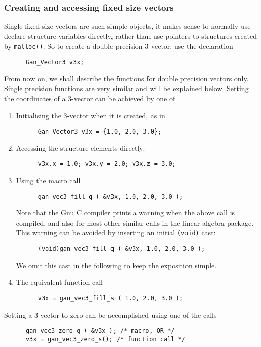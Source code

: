 \subsubsection{Creating and accessing fixed size vectors}
Single fixed size vectors are such simple objects, it makes sense to
normally use declare structure variables directly, rather than use pointers
to structures created by {\tt malloc()}. So to create a double precision
3-vector, use the declaration
\begin{verbatim}
      Gan_Vector3 v3x;
\end{verbatim}
From now on, we shall describe the functions for double precision vectors
only. Single precision functions are very similar and will be explained below.
Setting the coordinates of a 3-vector can be achieved by one of
\begin{enumerate}
  \item Initialising the 3-vector when it is created, as in
\begin{verbatim}
      Gan_Vector3 v3x = {1.0, 2.0, 3.0};
\end{verbatim}

  \item Accessing the structure elements directly:
\begin{verbatim}
      v3x.x = 1.0; v3x.y = 2.0; v3x.z = 3.0;
\end{verbatim}
  \item Using the macro call
\begin{verbatim}
      gan_vec3_fill_q ( &v3x, 1.0, 2.0, 3.0 );
\end{verbatim}
Note that the Gnu C compiler prints a warning when the above call is compiled,
and also for most other similar calls in the linear algebra package.
This warning can be avoided by inserting an initial {\tt (void)} cast:
\begin{verbatim}
      (void)gan_vec3_fill_q ( &v3x, 1.0, 2.0, 3.0 );
\end{verbatim}
We omit this cast in the following to keep the exposition simple.
  \item The equivalent function call
\begin{verbatim}
      v3x = gan_vec3_fill_s ( 1.0, 2.0, 3.0 );
\end{verbatim}
\end{enumerate}
Setting a 3-vector to zero can be accomplished using one of the calls
\begin{verbatim}
      gan_vec3_zero_q ( &v3x ); /* macro, OR */
      v3x = gan_vec3_zero_s(); /* function call */
\end{verbatim}

